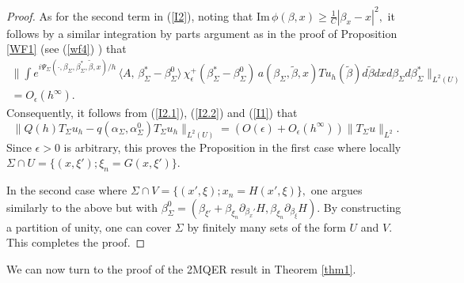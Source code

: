 \documentclass[11pt,reqno]{amsart}
\renewcommand{\Im} {\mathrm{Im\,}}
\theoremstyle{definition}
\begin{document}
\begin{proof}
 As for the second term in (\ref{I2}), noting that $\Im \phi(\beta,x) \geq \frac{1}{C} |\beta_x - x|^2,$ it follows by a similar integration by parts argument as in the proof of Proposition \ref{WF1} (see (\ref{wf4}) ) that 
 \begin{eqnarray} \label{I2.2}
\Big\| \int e^{i \Psi_{\Sigma}(\cdot, \beta_{\Sigma}, \beta_{\Sigma}^*, \tilde{\beta},x)/h} \, \langle A,   \,  \beta^{*}_{\Sigma} - \beta_{\Sigma}^{0}  \rangle  \, \chi_{\epsilon}^+ ( \beta^{*}_{\Sigma} - \beta_{\Sigma}^{0}  ) \, a (\beta_{\Sigma}, \tilde{\beta},x) Tu_h(\tilde{\beta}) d\tilde{\beta}  dx d\beta_{\Sigma} d \beta_{\Sigma}^* \Big\|_{L^2(U)}  \nonumber \\
 = O_{\epsilon}(h^{\infty}). \hspace{1in}
 \end{eqnarray}
 Consequently, it follows from (\ref{I2.1}), (\ref{I2.2}) and (\ref{I1}) that
 \begin{equation} \label{upshot}
\|  Q(h) T_{\Sigma} u_h  - q(\alpha_{\Sigma}, \alpha_{\Sigma}^0) T_{\Sigma} u_h \|_{L^2(U)} = ( O(\epsilon) + O_{\epsilon}(h^{\infty}) ) \| T_{\Sigma} u \|_{L^2}.
\end{equation}
Since $\epsilon >0$ is arbitrary, this proves the Proposition in the first case where locally $ \Sigma \cap U = \{ (x, \xi'); \xi_n = G(x,\xi') \}.$

In the second case where $ \Sigma \cap V = \{ (x',\xi); x_n = H(x',\xi)  \},$ one argues similarly to the above but with $\beta_{\Sigma}^0 = ( \beta_{\xi'} + \beta_{\xi_n} \partial_{\beta_x'}H, \beta_{\xi_n} \partial_{\beta_{\xi}}H ).$
By constructing  a partition of unity, one can cover $\Sigma$ by finitely many sets of the form $U$ and $V$. This completes the proof.

\end{proof}


We can now turn to the proof of the 2MQER result in Theorem \ref{thm1}.
\end{document}
